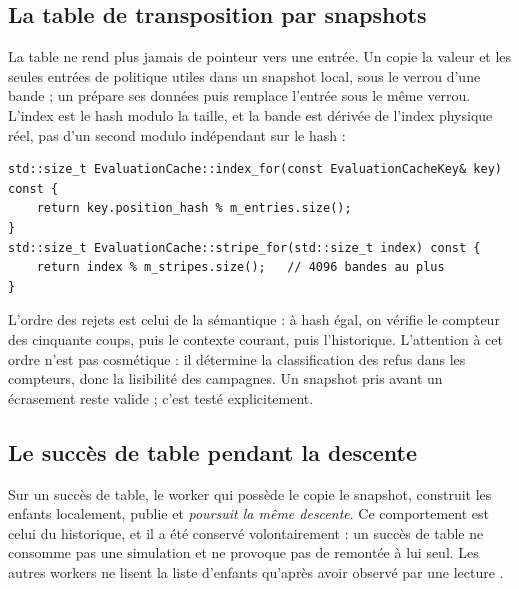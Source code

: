 \subsection{La table de transposition par snapshots}

La table ne rend plus jamais de pointeur vers une entr\'ee. Un
 copie la valeur et les seules entr\'ees de politique utiles
dans un snapshot local, sous le verrou d'une bande ; un 
pr\'epare ses donn\'ees puis remplace l'entr\'ee sous le m\^eme verrou.
L'index est le hash modulo la taille, et la bande est d\'eriv\'ee de l'index
physique r\'eel, pas d'un second modulo ind\'ependant sur le hash :

\begin{lstlisting}[caption={Index et bande. La bande est d\'eriv\'ee de
l'index r\'eellement acc\'ed\'e, ce qui garantit que deux cl\'es qui
s'\'ecrasent dans la m\^eme entr\'ee prennent toujours la m\^eme bande.},
label={lst:stripe}]
std::size_t EvaluationCache::index_for(const EvaluationCacheKey& key) const {
    return key.position_hash % m_entries.size();
}
std::size_t EvaluationCache::stripe_for(std::size_t index) const {
    return index % m_stripes.size();   // 4096 bandes au plus
}
\end{lstlisting}

L'ordre des rejets est celui de la s\'emantique  : \`a hash
\'egal, on v\'erifie le compteur des cinquante coups, puis le contexte
courant, puis l'historique. L'attention \`a cet ordre n'est pas
cosm\'etique : il d\'etermine la classification des refus dans les compteurs,
donc la lisibilit\'e des campagnes. Un snapshot pris avant un
\'ecrasement reste valide ; c'est test\'e explicitement.

\subsection{Le succ\`es de table pendant la descente}

Sur un succ\`es de table, le worker qui poss\`ede le  copie le
snapshot, construit les enfants localement, publie  et
\emph{poursuit la m\^eme descente}. Ce comportement est celui du
 historique, et il a \'et\'e conserv\'e volontairement :
un succ\`es de table ne consomme pas une simulation et ne provoque pas de
remont\'ee \`a lui seul. Les autres workers ne lisent la liste d'enfants
qu'apr\`es avoir observ\'e  par une lecture .

